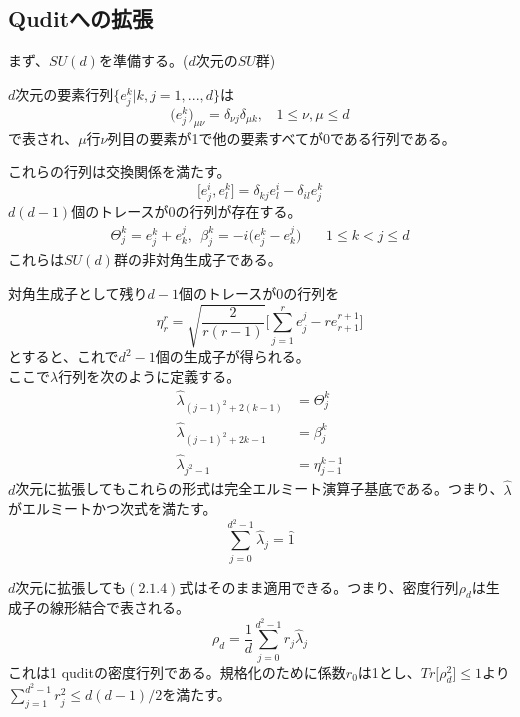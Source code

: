\documentclass[11pt,a4j,notitlepage]{jreport}
\begin{document}
	\subsection{Quditへの拡張}

	まず、$SU(d)$を準備する。($d$次元の$SU$群)

	$d$次元の要素行列$\{ e_j^k|k,j=1,...,d \}$は
	\begin{equation}
		\big( e_j^k \big) _{\mu \nu} = \delta_{\nu j} \delta_{\mu k}, \ \ \ \ 1 \leq \nu, \mu \leq d
	\end{equation}
	で表され、$\mu$行$\nu$列目の要素が1で他の要素すべてが0である行列である。

	これらの行列は交換関係を満たす。
	\begin{equation}
		\big[ e_j^i, e_l^k \big] = \delta_{kj} e_l^i - \delta_{il} e_j^k
	\end{equation}
	$d(d-1)$個のトレースが0の行列が存在する。
	\begin{equation}
		\begin{aligned}
			\Theta_j^k = e_j^k + e_k^j, \ \ \beta_j^k = -i \big( e_j^k - e_k^j \big) \ \ \ \ \ \ \ \ 1 \leq k < j \leq d
		\end{aligned}
	\end{equation}
	これらは$SU(d)$群の非対角生成子である。

	対角生成子として残り$d-1$個のトレースが0の行列を
	\begin{equation}
		\eta_r^r = \sqrt{\frac{2}{r(r-1)}} \Biggl[ \sum_{j=1}^r e_j^j - r e_{r+1}^{r+1} \Biggr]
	\end{equation}
	とすると、これで$d^2-1$個の生成子が得られる。\\
	ここで$\lambda$行列を次のように定義する。
	\begin{equation}
		\begin{aligned}
			\hat{\lambda}_{(j-1)^2 + 2(k-1)} &= \Theta_j^k\\
			\hat{\lambda}_{(j-1)^2 + 2k-1} &= \beta_j^k\\
			\hat{\lambda}_{j^2-1} &= \eta_{j-1}^{k-1}
		\end{aligned}
	\end{equation}
	$d$次元に拡張してもこれらの形式は完全エルミート演算子基底である。つまり、$\hat{\lambda}$がエルミートかつ次式を満たす。
	\begin{equation}
		\sum_{j=0}^{d^2 - 1} \hat{\lambda}_j = \hat{1}
	\end{equation}

	$d$次元に拡張しても$(2.1.4)$式はそのまま適用できる。つまり、密度行列$\rho_d$は生成子の線形結合で表される。
	\begin{equation}
		\rho_d = \frac{1}{d} \sum_{j=0}^{d^2 - 1} r_j \hat{\lambda}_j
	\end{equation}
	これは1 quditの密度行列である。規格化のために係数$r_0$は1とし、$Tr \big[ \rho_d^2 \big] \leq 1$より$\sum_{j=1}^{d^2 - 1} r_j^2 \leq d(d-1)/2$を満たす。
\end{document}

